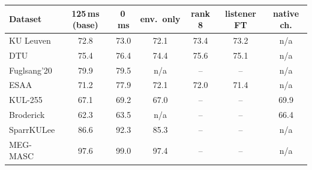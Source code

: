 \begin{tabular}{lcccccc}\toprule
Dataset & 125\,ms (base) & 0\,ms & env.\ only & rank 8 & listener FT & native ch. \\\midrule
KU Leuven & 72.8 & 73.0 & 72.1 & 73.4 & 73.2 & n/a \\
DTU & 75.4 & 76.4 & 74.4 & 75.6 & 75.1 & n/a \\
Fuglsang'20 & 79.9 & 79.5 & n/a & -- & -- & n/a \\
ESAA & 71.2 & 77.9 & 72.1 & 72.0 & 71.4 & n/a \\
KUL-255 & 67.1 & 69.2 & 67.0 & -- & -- & 69.9 \\
Broderick & 62.3 & 63.5 & n/a & -- & -- & 66.4 \\
SparrKULee & 86.6 & 92.3 & 85.3 & -- & -- & n/a \\
MEG-MASC & 97.6 & 99.0 & 97.4 & -- & -- & n/a \\
\bottomrule\end{tabular}
